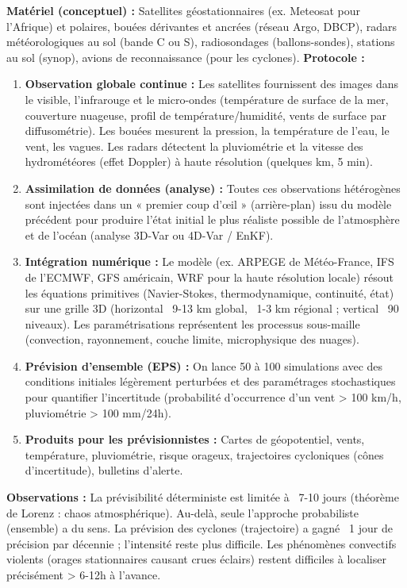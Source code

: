 \documentclass[11pt]{article}
\begin{document}
\begin{experience}
\textbf{Matériel (conceptuel) :} Satellites géostationnaires (ex. Meteosat pour l'Afrique) et polaires, bouées dérivantes et ancrées (réseau Argo, DBCP), radars météorologiques au sol (bande C ou S), radiosondages (ballons-sondes), stations au sol (synop), avions de reconnaissance (pour les cyclones).
\textbf{Protocole :}
\begin{enumerate}
    \item \textbf{Observation globale continue :} Les satellites fournissent des images dans le visible, l'infrarouge et le micro-ondes (température de surface de la mer, couverture nuageuse, profil de température/humidité, vents de surface par diffusométrie). Les bouées mesurent la pression, la température de l'eau, le vent, les vagues. Les radars détectent la pluviométrie et la vitesse des hydrométéores (effet Doppler) à haute résolution (quelques km, 5 min).
    \item \textbf{Assimilation de données (analyse) :} Toutes ces observations hétérogènes sont injectées dans un « premier coup d'œil » (arrière-plan) issu du modèle précédent pour produire l'état initial le plus réaliste possible de l'atmosphère et de l'océan (analyse 3D-Var ou 4D-Var / EnKF).
    \item \textbf{Intégration numérique :} Le modèle (ex. ARPEGE de Météo-France, IFS de l'ECMWF, GFS américain, WRF pour la haute résolution locale) résout les équations primitives (Navier-Stokes, thermodynamique, continuité, état) sur une grille 3D (horizontal ~9-13 km global, ~1-3 km régional ; vertical ~90 niveaux). Les paramétrisations représentent les processus sous-maille (convection, rayonnement, couche limite, microphysique des nuages).
    \item \textbf{Prévision d'ensemble (EPS) :} On lance 50 à 100 simulations avec des conditions initiales légèrement perturbées et des paramétrages stochastiques pour quantifier l'incertitude (probabilité d'occurrence d'un vent > 100 km/h, pluviométrie > 100 mm/24h).
    \item \textbf{Produits pour les prévisionnistes :} Cartes de géopotentiel, vents, température, pluviométrie, risque orageux, trajectoires cycloniques (cônes d'incertitude), bulletins d'alerte.
\end{enumerate}
\textbf{Observations :} La prévisibilité déterministe est limitée à ~7-10 jours (théorème de Lorenz : chaos atmosphérique). Au-delà, seule l'approche probabiliste (ensemble) a du sens. La prévision des cyclones (trajectoire) a gagné ~1 jour de précision par décennie ; l'intensité reste plus difficile. Les phénomènes convectifs violents (orages stationnaires causant crues éclairs) restent difficiles à localiser précisément > 6-12h à l'avance.

\end{experience}
\end{document}
